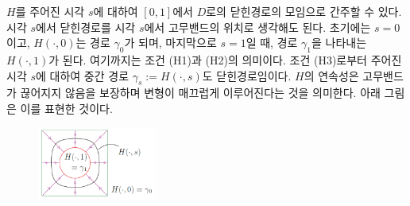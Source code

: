 $H$를 주어진 시각 $s$에 대하여
$[0,1]$에서 $D$로의 닫힌경로의 모임으로 간주할 수 있다.
시각 $s$에서 닫힌경로를 시각 $s$에서 고무밴드의 위치로 생각해도 된다.
초기에는 $s=0$이고, $H(\cdot, 0)$는 경로 $\gamma_0$가 되며,
마지막으로 $s=1$일 때, 경로 $\gamma_1$을 나타내는
$H(\cdot, 1)$가 된다.
여기까지는 조건 (H1)과 (H2)의 의미이다.
조건 (H3)로부터 주어진 시각 $s$에 대하여 중간 경로 
$\gamma_s:= H(\cdot, s)$도 닫힌경로임이다.
$H$의 연속성은 고무밴드가 끊어지지 않음을 보장하며
변형이 매끄럽게 이루어진다는 것을 의미한다.
아래 그림은 이를 표현한 것이다.

\begin{figure}[!h]
\begin{center}
\includegraphics[width=0.35\textwidth]{./SaltChapter/fig-3-0-2}
\end{center}
\end{figure}


